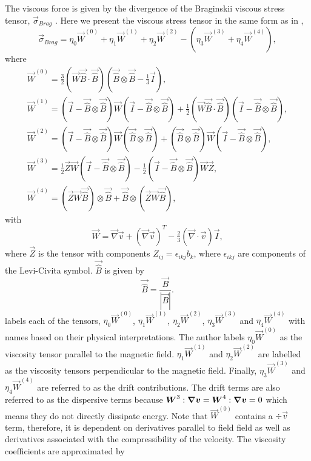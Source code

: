 The viscous force is given by the divergence of the Braginskii viscous stress tensor, $\vec{\sigma}_{Brag}$ \citep{Braginskii1965}. Here we present the viscous stress tensor in the same form as in \citet{MacTaggart2017},
\begin{equation}
    \label{eq:braginskii_viscous_stress_tensor}
    \vec{\sigma}_{Brag}=\eta_0\vec{W}^{(0)}+\eta_1\vec{W}^{(1)}+\eta_2\vec{W}^{(2)}
    -(\eta_3\vec{W}^{(3)}+\eta_4\vec{W}^{(4)}),
\end{equation}
where
\begin{gather}
    \vec{W}^{(0)}=\tfrac{3}{2}(\vec{W}\vec{\hat{B}}\cdot\vec{\hat{B}})(\vec{\hat{B}}\otimes\vec{\hat{B}}-\tfrac{1}{3}\vec{I}),\\
    \vec{W}^{(1)}=(\vec{I}-\vec{\hat{B}}\otimes\vec{\hat{B}})\vec{W}(\vec{I}-\vec{\hat{B}}\otimes\vec{\hat{B}})
    +\tfrac{1}{2}(\vec{W}\vec{\hat{B}}\cdot\vec{\hat{B}})(\vec{I}-\vec{\hat{B}}\otimes\vec{\hat{B}}),\\
    \vec{W}^{(2)}=(\vec{I}-\vec{\hat{B}}\otimes\vec{\hat{B}})\vec{W}(\vec{\hat{B}}\otimes\vec{\hat{B}})+(\vec{\hat{B}}\otimes\vec{\hat{B}})\vec{W}(\vec{I}-\vec{\hat{B}}\otimes\vec{\hat{B}}),\\
    \vec{W}^{(3)}=\tfrac{1}{2}\vec{Z}\vec{W}(\vec{I}-\vec{\hat{B}}\otimes\vec{\hat{B}})-\tfrac{1}{2}(\vec{I}-\vec{\hat{B}}\otimes\vec{\hat{B}})\vec{W}\vec{Z}, \\
    \vec{W}^{(4)}=(\vec{Z}\vec{W}\vec{\hat{B}})\otimes\vec{\hat{B}}+\vec{\hat{B}}\otimes(\vec{Z}\vec{W}\vec{\hat{B}}),
\end{gather}
with 
\begin{equation}
    \vec{W}=\vec{\nabla}\vec{v}+(\vec{\nabla}\vec{v})^T-\tfrac{2}{3}(\vec{\nabla}\cdot\vec{v})\vec{I},
\end{equation}
where $\vec{Z}$ is the tensor with components $Z_{ij}=\epsilon_{ikj}b_k$, where $\epsilon_{ikj}$ are components of the Levi-Civita symbol. $\vec{\hat{B}}$ is given by
\begin{equation}
    \vec{\hat{B}}=\frac{\vec{B}}{|\vec{B}|}.
\end{equation}
\citet{Hogan1984} labels each of the tensors, $\eta_0\vec{W}^{(0)}$, $\eta_1\vec{W}^{(1)}$, $\eta_2\vec{W}^{(2)}$, $\eta_3\vec{W}^{(3)}$ and  $\eta_4\vec{W}^{(4)}$ with names based on their physical interpretations. The author labels $\eta_0\vec{W}^{(0)}$ as the viscosity tensor parallel to the magnetic field. $\eta_1\vec{W}^{(1)}$ and $\eta_2\vec{W}^{(2)}$ are labelled as the viscosity tensors perpendicular to the magnetic field. Finally, $\eta_3\vec{W}^{(3)}$ and $\eta_4\vec{W}^{(4)}$ are referred to as the drift contributions. The drift terms are also referred to as the dispersive terms because $\boldsymbol{W}^{3}:\grad \boldsymbol{v}=\boldsymbol{W}^{4}:\grad \boldsymbol{v}=0$ which means they do not directly dissipate energy. Note that $\vec{W}^{(0)}$ contains a $\div{\vec{v}}$ term, therefore, it is dependent on derivatives parallel to field field as well as derivatives associated with the compressibility of the velocity. The viscosity coefficients are approximated by
